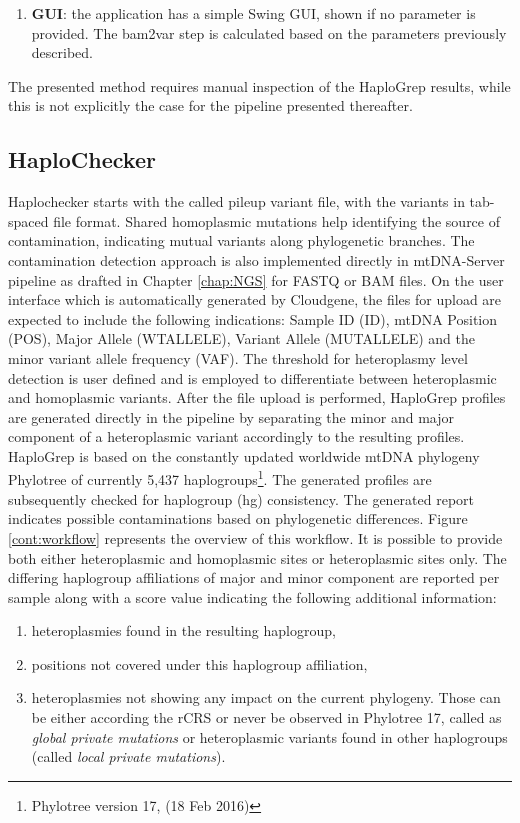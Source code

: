 \begin{enumerate}
\begin{lstlisting}[language=bash]
java -jar greenVC-0.1.jar lofreq --in inputfile.vcf --out haplogrepinput.hsd 
\end{lstlisting}
\item \textbf{GUI}: the application has a simple Swing GUI, shown if no parameter is provided. The bam2var step is calculated based on the parameters previously described.
\end{enumerate}
The presented method requires manual inspection of the HaploGrep results, while this is not explicitly the case for the pipeline presented thereafter. 
\subsection{HaploChecker}\label{cont:haplochecker}
Haplochecker starts with the called pileup variant file, with the variants in tab-spaced file format. Shared homoplasmic mutations help identifying the source of contamination, indicating mutual variants along phylogenetic branches. The contamination detection approach is also implemented directly in mtDNA-Server pipeline as drafted in Chapter \ref{chap:NGS} for FASTQ or BAM files. On the user interface which is automatically generated by Cloudgene, the files for upload are expected to include the following indications: Sample ID (ID), mtDNA Position (POS), Major Allele (WTALLELE), Variant Allele (MUTALLELE) and the minor variant allele frequency (VAF). The threshold for heteroplasmy level detection is user defined and is employed to differentiate between heteroplasmic and homoplasmic variants. After the file upload is performed, HaploGrep  profiles are generated directly in the pipeline by separating the minor and major component of a heteroplasmic variant accordingly to the resulting profiles. HaploGrep is based on the constantly updated worldwide mtDNA phylogeny Phylotree of currently 5,437 haplogroups\footnote{Phylotree version 17, (18 Feb 2016)}. The generated profiles are subsequently checked for haplogroup (hg) consistency. The generated report indicates possible contaminations based on phylogenetic differences. Figure \ref{cont:workflow} represents the overview of this workflow. It is possible to provide both either heteroplasmic and homoplasmic sites or heteroplasmic sites only. The differing haplogroup affiliations of major and minor component are reported per sample along with a score value indicating the following additional information: 
\begin{enumerate}[label=(\alph*)]
\item heteroplasmies found in the resulting haplogroup, 
\item positions not covered under this haplogroup affiliation, 
\item heteroplasmies not showing any impact on the current phylogeny. Those can be either according the rCRS or never be observed in Phylotree 17, called as \textit{global private mutations} or heteroplasmic variants found in other haplogroups (called \textit{local private mutations}).
\end{enumerate}

